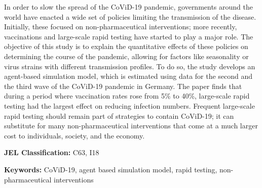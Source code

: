 \noindent
% 
In order to slow the spread of the CoViD-19 pandemic, governments around the world have
enacted a wide set of policies limiting the transmission of the disease. Initially,
these focused on non-pharmaceutical interventions; more recently, vaccinations and
large-scale rapid testing have started to play a major role. The objective of this study
is to explain the quantitative effects of these policies on determining the course of
the pandemic, allowing for factors like seasonality or virus strains with different
transmission profiles. To do so, the study develops an agent-based simulation
model, which is estimated using data for the second and the third wave of the CoViD-19
pandemic in Germany. The paper finds that during a period where vaccination rates rose
from 5\% to 40\%, large-scale rapid testing had the largest effect on reducing infection
numbers. 
Frequent large-scale rapid testing should remain part of strategies to contain
CoViD-19; it can substitute for many non-pharmaceutical interventions that come at a
much larger cost to individuals, society, and the economy.


\vspace{1cm}
\noindent \textbf{JEL Classification:} C63, I18

\noindent \textbf{Keywords:} CoViD-19, agent based simulation model, rapid testing,
non-pharmaceutical interventions